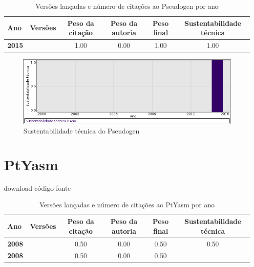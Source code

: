 \begin{table}[H]
\caption{Versões lançadas e número de citações ao Pseudogen por ano}
\centering
\begin{tabular}{| l | c | c | c | c | c |}
  \hline
  Ano & Versões & Peso da citação & Peso da autoria & Peso final & Sustentabilidade técnica \\
  \hline
            {\bf 2015}
          &
          
          &
          1.00
          &
          0.00
          &
          1.00
          &
            {\color{blue} 1.00}
          \\
\hline
\end{tabular}
\end{table}

\begin{figure}[h]
  \center
  \includegraphics[scale=0.50]{imagens/softwares-charts/pseudogen.png}
  \caption{Sustentabilidade técnica do Pseudogen}
\end{figure}


\section{PtYasm}
\checkmark download
\checkmark código fonte


\begin{table}[H]
\caption{Versões lançadas e número de citações ao PtYasm por ano}
\centering
\begin{tabular}{| l | c | c | c | c | c |}
  \hline
  Ano & Versões & Peso da citação & Peso da autoria & Peso final & Sustentabilidade técnica \\
  \hline
            {\bf 2008}
          &
          
          &
          0.50
          &
          0.00
          &
          0.50
          &
            {\color{blue} 0.50}
          \\
            {\bf 2008}
          &
          
          &
          0.50
          &
          0.00
          &
          0.50
          &
          \\
\hline
\end{tabular}
\end{table}


